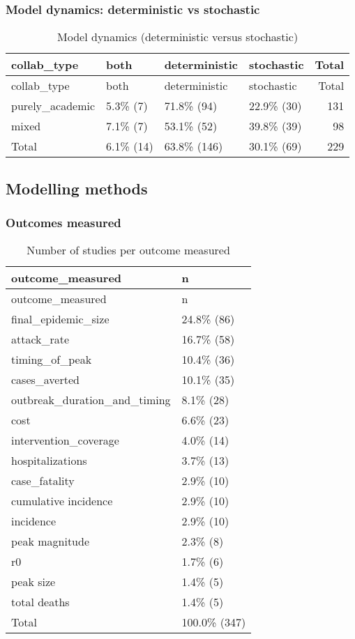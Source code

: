 \documentclass[
]{article}
\begin{document}
\hypertarget{model-dynamics-deterministic-vs-stochastic}{%
\subsubsection{Model dynamics: deterministic vs
stochastic}\label{model-dynamics-deterministic-vs-stochastic}}

\begin{longtable}[]{@{}llllr@{}}
\caption{Model dynamics (deterministic versus
stochastic)}\tabularnewline
\toprule
collab\_type & both & deterministic & stochastic & Total \\
\midrule
\endfirsthead
\toprule
collab\_type & both & deterministic & stochastic & Total \\
\midrule
\endhead
purely\_academic & 5.3\% (7) & 71.8\% (94) & 22.9\% (30) & 131 \\
mixed & 7.1\% (7) & 53.1\% (52) & 39.8\% (39) & 98 \\
Total & 6.1\% (14) & 63.8\% (146) & 30.1\% (69) & 229 \\
\bottomrule
\end{longtable}

\hypertarget{modelling-methods}{%
\subsection{Modelling methods}\label{modelling-methods}}

\hypertarget{outcomes-measured}{%
\subsubsection{Outcomes measured}\label{outcomes-measured}}

\begin{longtable}[]{@{}ll@{}}
\caption{Number of studies per outcome measured}\tabularnewline
\toprule
outcome\_measured & n \\
\midrule
\endfirsthead
\toprule
outcome\_measured & n \\
\midrule
\endhead
final\_epidemic\_size & 24.8\% (86) \\
attack\_rate & 16.7\% (58) \\
timing\_of\_peak & 10.4\% (36) \\
cases\_averted & 10.1\% (35) \\
outbreak\_duration\_and\_timing & 8.1\% (28) \\
cost & 6.6\% (23) \\
intervention\_coverage & 4.0\% (14) \\
hospitalizations & 3.7\% (13) \\
case\_fatality & 2.9\% (10) \\
cumulative incidence & 2.9\% (10) \\
incidence & 2.9\% (10) \\
peak magnitude & 2.3\% (8) \\
r0 & 1.7\% (6) \\
peak size & 1.4\% (5) \\
total deaths & 1.4\% (5) \\
Total & 100.0\% (347) \\
\bottomrule
\end{longtable}
\end{document}
